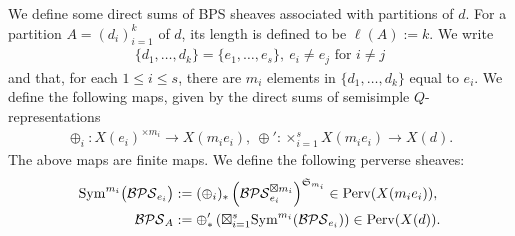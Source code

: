 \documentclass [11pt,oneside,a4paper,mathscr]{amsart}
\theoremstyle{definition}
\renewcommand{\leq}{\leqslant}
\begin{document}
We define some direct sums of BPS sheaves 
associated with partitions of $d$. 
For a partition $A=(d_i)_{i=1}^k$ of $d$, its length is defined to be $\ell(A):=k$. We write
\begin{align*}\{d_1, \ldots, d_k\}=\{e_1,\ldots, e_s\}, \ 
e_i \neq e_j \mbox{ for } i\neq j
\end{align*}
and that, for each $1\leq i\leq s$, there are $m_i$ elements in $\{d_1, \ldots, d_k\}$ equal to $e_i$. 
We define the following maps, 
given by the direct sums of semisimple 
$Q$-representations  
\begin{align*}\oplus_i\colon X(e_i)^{\times m_i}\to X(m_ie_i), \
\oplus'\colon \times_{i=1}^s X(m_ie_i)\to X(d).
\end{align*}
The above maps are finite maps.
We define the following perverse sheaves: 
\begin{align}\label{BPSAsheaf}
    \notag\mathrm{Sym}^{m_i}\big(\mathcal{BPS}_{e_i}\big)&:=(\oplus_{i})_{*}\left(\mathcal{BPS}_{e_i}^{\boxtimes m_i}\right)^{\mathfrak{S}_{m_i}}\in \mathrm{Perv}(X(m_ie_i)),\\
    \mathcal{BPS}_{A}&:=\oplus'_{\ast}\left(\boxtimes_{i=1}^s \mathrm{Sym}^{m_i}(\mathcal{BPS}_{e_i})\right)\in \mathrm{Perv}(X(d)).
\end{align}
\end{document}
